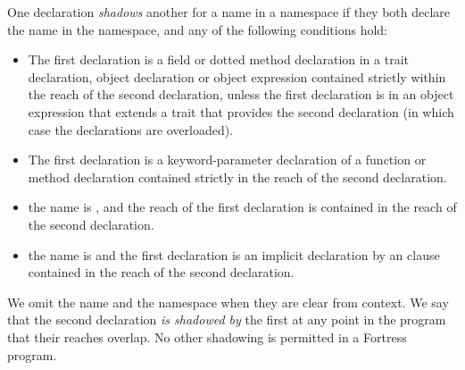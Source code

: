 One declaration \emph{shadows} another for a name in a namespace 
if they both declare the name in the namespace,
and any of the following conditions hold:
\begin{itemize}

\item
The first declaration is a field or dotted method declaration 
in a trait declaration, object declaration or object expression
contained strictly within the reach of the second declaration, 
unless the first declaration is in an object expression 
that extends a trait 
that provides the second declaration 
(in which case the declarations are overloaded).


\item
The first declaration is a keyword-parameter declaration 
of a function or method declaration 
contained strictly in the reach of the second declaration.

\item
the name is , 
and the reach of the first declaration 
is contained in the reach of the second declaration.

\item
the name is 
and the first declaration is an implicit declaration by an  clause 
contained in the reach of the second declaration.

\end{itemize}
We omit the name and the namespace when they are clear from context.
We say that the second declaration \emph{is shadowed by} the first 
at any point in the program that their reaches overlap.
No other shadowing is permitted in a Fortress program.


